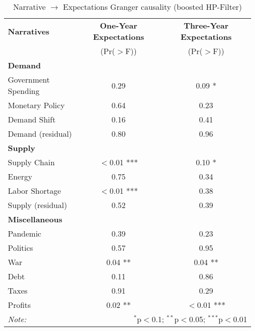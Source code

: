 \begin{table}[ht]
\centering
\caption{Narrative $\rightarrow$ Expectations Granger causality (boosted HP-Filter)}\label{tab:granger_bHP}

\begin{tabular}{lcc}
\toprule
\textbf{Narratives} & \textbf{One-Year Expectations} & \textbf{Three-Year Expectations} \\
& (Pr($>$F)) & (Pr($>$F)) \\
\midrule
\multicolumn{3}{l}{\textbf{Demand}} \\
\midrule
Government Spending & 0.29 & 0.09 * \\
Monetary Policy & 0.64 & 0.23 \\
Demand Shift & 0.16 & 0.41 \\
Demand (residual) & 0.80 & 0.96 \\
\midrule
\multicolumn{3}{l}{\textbf{Supply}} \\
\midrule
Supply Chain & $<$0.01 *** & 0.10 * \\
Energy & 0.75 & 0.34 \\
Labor Shortage & $<$0.01 *** & 0.38 \\
Supply (residual) & 0.52 & 0.39 \\
\midrule
\multicolumn{3}{l}{\textbf{Miscellaneous}} \\
\midrule
Pandemic & 0.39 & 0.23 \\
Politics & 0.57 & 0.95 \\
War & 0.04 ** & 0.04 ** \\
Debt & 0.11 & 0.86 \\
Taxes & 0.91 & 0.29 \\
Profits & 0.02 ** & $<$0.01 *** \\
\midrule
\bottomrule
\textit{Note:}  & \multicolumn{2}{r}{$^{*}$p$<$0.1; $^{**}$p$<$0.05; $^{***}$p$<$0.01} \\
\bottomrule
\end{tabular}
\end{table}

